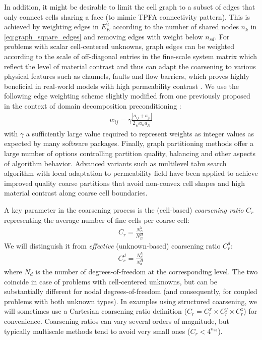 \begin{itemize}
    In addition, it might be desirable to limit the cell graph to a subset of edges that only connect cells sharing a face (to mimic TPFA connectivity pattern).   This is achieved by weighting edges in $E_E^2$ according to the number of shared nodes $n_k$ in \cref{eq:graph_square_edges} and removing edges with weight below $n_{sd}$.   For problems with scalar cell-centered unknowns, graph edges can be weighted according to the scale of off-diagonal entries in the fine-scale system matrix which reflect the level of material contrast and thus can adapt the coarsening to various physical features such as channels, faults and flow barriers, which proves highly beneficial in real-world models with high permeability contrast \cite{Klemetsdal2020}.   We use the following edge weighting scheme slightly modified from one previously proposed in the context of domain decomposition preconditioning \cite{Vecharynski2014}:
    \begin{align}
        w_{ij} = \gamma \frac{|a_{ij} + a_{ji}|}{2\sqrt{a_{ii} a_{jj}}} \label{eq:graph_matrix_weights}
    \end{align}
    with $\gamma$ a sufficiently large value required to represent weights as integer values as expected by many software packages.    Finally, graph partitioning methods offer a large number of options controlling partition quality, balancing and other aspects of algorithm behavior.   Advanced variants such as multilevel tabu search algorithm with local adaptation to permeability field \cite{Mehrdoost2019} have been applied to achieve improved quality coarse partitions that avoid non-convex cell shapes and high material contrast along coarse cell boundaries.
\end{itemize}

A key parameter in the coarsening process is the (cell-based) \textit{coarsening ratio} $C_r$ representing the average number of fine cells per coarse cell:
\begin{align}
    C_r = \frac{N_E^h}{N_E^H}
\end{align}
We will distinguish it from \textit{effective} (unknown-based) coarsening ratio $C_r^d$:
\begin{align}
    C_r^d = \frac{N_d^h}{N_d^H}
\end{align}
where $N_d$ is the number of degrees-of-freedom at the corresponding level. The two coincide in case of problems with cell-centered unknowns, but can be substantially different for nodal degrees-of-freedom (and consequently, for coupled problems with both unknown types). In examples using structured coarsening, we will sometimes use a Cartesian coarsening ratio definition ($C_r = C_r^x \times C_r^y \times C_r^z$) for convenience. Coarsening ratios can vary several orders of magnitude, but typically multiscale methods tend to avoid very small ones ($C_r < 4^{n_{sd}}$).

